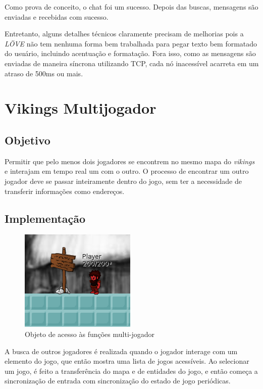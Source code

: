     Como prova de conceito, o chat foi um sucesso. Depois das buscas, mensagens são enviadas
    e recebidas com sucesso.
    
    Entretanto, alguns detalhes técnicos claramente precisam de melhorias pois a \textit{LÖVE}
    não tem nenhuma forma bem trabalhada para pegar texto bem formatado do usuário, incluindo
    acentuação e formatação. Fora isso, como as mensagens são enviadas de maneira síncrona
    utilizando TCP, cada nó inacessível acarreta em um atraso de 500ms ou mais.
    
\section{Vikings Multijogador}
\label{sec:experimentos:vikings}

  \subsection{Objetivo}
    Permitir que pelo menos dois jogadores se encontrem no mesmo mapa do \textit{vikings} e
    interajam em tempo real um com o outro. O processo de encontrar um outro jogador deve se
    passar inteiramente dentro do jogo, sem ter a necessidade de transferir informações como
    endereços.
    
  \subsection{Implementação}
    \begin{figure}[h]
      \centering
      \includegraphics{imagens/vikings-signpost.png}
      \caption{Objeto de acesso às funções multi-jogador}
    \end{figure}
    
    A busca de outros jogadores é realizada quando o jogador interage com um elemento do jogo,
    que então mostra uma lista de jogos acessíveis. Ao selecionar um jogo, é feito a transferência
    do mapa e de entidades do jogo, e então começa a sincronização de entrada com sincronização
    do estado de jogo periódicas.
    
